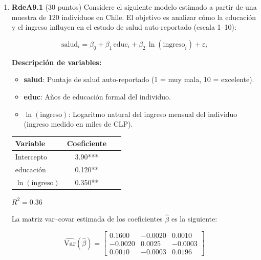 \documentclass[10pt,a4paper]{article}
\begin{document}
\begin{enumerate}
\begin{enumerate}
\item (6 puntos)  ¿Incluiría usted \textit{roe} y \textit{ros} en el modelo final que explica las compensaciones de los CEO en términos del desempeño de la empresa? Explique.
\end{enumerate}

 \item \textbf{RdeA9.1 } (30 puntos)  Considere el siguiente modelo estimado a partir de una muestra de 120 individuos en Chile.  
El objetivo es analizar cómo la educación y el ingreso influyen en el estado de salud auto-reportado (escala 1–10):

\[
\mathrm{salud}_i = \beta_0 + \beta_1\,\mathrm{educ}_i + \beta_2\,\ln(\mathrm{ingreso}_i) + \varepsilon_i
\]

\noindent
\textbf{Descripción de variables:}
\begin{itemize}
    \item \textbf{salud}: Puntaje de salud auto-reportado (1 = muy mala, 10 = excelente).
    \item \textbf{educ}: Años de educación formal del individuo.
    \item \textbf{$\ln(\mathrm{ingreso})$}: Logaritmo natural del ingreso mensual del individuo (ingreso medido en miles de CLP).
\end{itemize}


\begin{table}[h!]
\centering
\begin{tabular}{lcc}
\toprule
\textbf{Variable} & \textbf{Coeficiente} & \ \\
\midrule
Intercepto         & 3.90***   \\
educación          & 0.120**   \\
$\ln(\mathrm{ingreso})$ & 0.350**  \\
\bottomrule
\end{tabular}
\vspace{0.5em}

\noindent
$R^2 = 0.36$ \\[0.3em]

\end{table}

\noindent
La matriz var–covar estimada de los coeficientes $\hat{\beta}$ es la siguiente:

\[
\widehat{\mathrm{Var}}(\hat{\beta}) =
\begin{bmatrix}
0.1600 & -0.0020 & 0.0010 \\
-0.0020 & 0.0025 & -0.0003 \\
0.0010 & -0.0003 & 0.0196
\end{bmatrix}
\]




\end{enumerate}
\end{document}
